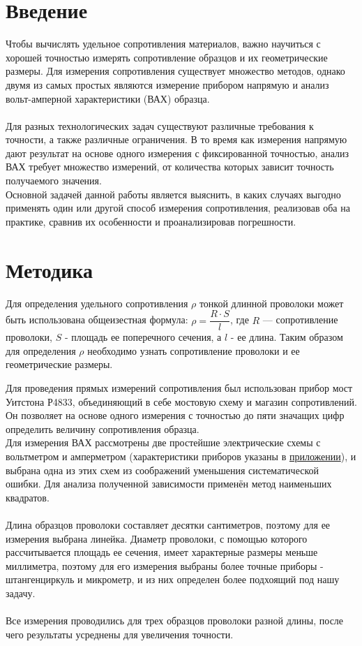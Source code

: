 \documentclass[12pt]{article}
\begin{document}
\section{Введение} %
Чтобы вычислять удельное сопротивления материалов, важно научиться с хорошей точностью измерять сопротивление образцов и их геометрические размеры. Для измерения сопротивления существует множество методов, однако двумя из самых простых являются измерение прибором напрямую и анализ вольт-амперной характеристики (ВАХ) образца.
\\ 
\\
Для разных технологических задач существуют различные требования к точности, а также различные ограничения. В то время как измерения напрямую дают результат на основе одного измерения с фиксированной точностью, анализ ВАХ требует множество измерений, от количества которых зависит точность получаемого значения.  \\
Основной задачей данной работы является выяснить, в каких случаях выгодно применять один или другой способ измерения сопротивления, реализовав оба на практике, сравнив их особенности и проанализировав погрешности.


\section{Методика}
Для определения удельного сопротивления $\rho$ тонкой длинной проволоки может быть использована общеизестная формула: $\rho = \dfrac{R\cdot S}{l}$, где $R$ — сопротивление проволоки, $S$ - площадь ее поперечного сечения, а $l$ - ее длина. Таким образом для определения $\rho$ необходимо узнать сопротивление проволоки и ее геометрические размеры. 

Для проведения прямых измерений сопротивления был использован прибор мост Уитстона Р4833,  объединяющий в себе мостовую схему и магазин сопротивлений. Он позволяет на основе одного измерения с точностью до пяти значащих цифр определить величину сопротивления образца.\\
Для измерения ВАХ рассмотрены две простейшие электрические схемы с вольтметром и амперметром (характеристики приборов указаны в \hyperref[sec: characteristics]{приложении}), и выбрана одна из этих схем из соображений уменьшения систематической ошибки. Для анализа полученной зависимости применён метод наименьших квадратов.\\
\\
Длина образцов проволоки составляет десятки сантиметров, поэтому для ее измерения выбрана линейка. Диаметр проволоки, с помощью которого рассчитывается площадь ее сечения, имеет характерные размеры меньше миллиметра, поэтому для его измерения выбраны более точные приборы - штангенциркуль и микрометр, и из них определен более подхоящий под нашу задачу.\\
\\
Все измерения проводились для трех образцов проволоки разной длины, после чего результаты усреднены для увеличения точности.
\end{document}
